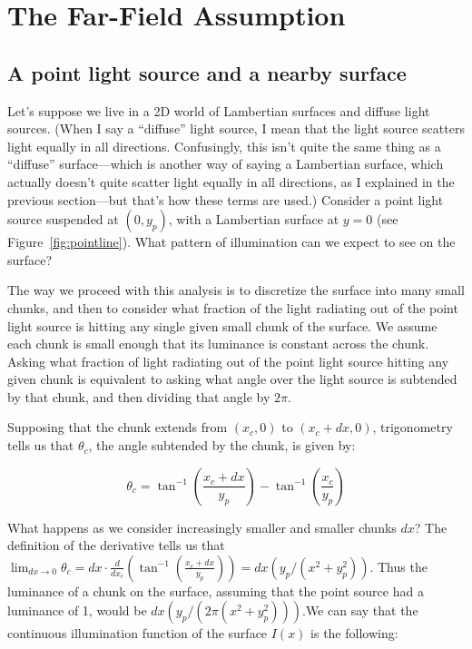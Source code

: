 \section{The Far-Field Assumption}

\subsection{A point light source and a nearby surface}

    Let's suppose we live in a 2D world of Lambertian surfaces and diffuse light sources. (When I say a ``diffuse'' light source, I mean that the light source scatters light equally in all directions. Confusingly, this isn't quite the same thing as a ``diffuse'' surface---which is another way of saying a Lambertian surface, which actually doesn't quite scatter light equally in all directions, as I explained in the previous section---but that's how these terms are used.) Consider a point light source suspended at $(0, y_p)$, with a Lambertian surface at $y=0$ (see Figure~\ref{fig:pointline}). What pattern of illumination can we expect to see on the surface?
    
    The way we proceed with this analysis is to discretize the surface into many small chunks, and then to consider what fraction of the light radiating out of the point light source is hitting any single given small chunk of the surface. We assume each chunk is small enough that its luminance is constant across the chunk. Asking what fraction of light radiating out of the point light source hitting any given  chunk is equivalent to asking what angle over the light source is subtended by that chunk, and then dividing that angle by $2\pi$. 
    
    Supposing that the chunk extends from $(x_c, 0)$ to $(x_c + dx, 0)$, trigonometry tells us that $\theta_c$, the angle subtended by the chunk, is given by:
    
$$\theta_c = \tan^{-1}\left(\frac{x_c+dx}{y_p}\right) - \tan^{-1}\left(\frac{x_c}{y_p}\right)$$

    What happens as we consider increasingly smaller and smaller chunks $dx$? The definition of the derivative tells us that $\lim_{dx \rightarrow 0} \theta_c = dx \cdot \frac{d}{dx_c}(\tan^{-1}(\frac{x_c+dx}{y_p})) = dx (y_p/(x^2 + y_p^2))$. Thus the luminance of a chunk on the surface, assuming that the point source had a luminance of 1, would be $dx (y_p/(2\pi(x^2 + y_p^2)))$.\footnotemark We can say that the continuous illumination function of the surface $I(x)$ is the following:
    
